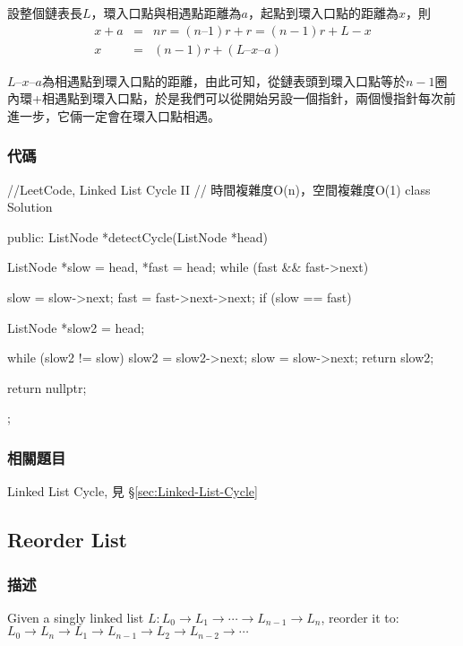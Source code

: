 設整個鏈表長$L$，環入口點與相遇點距離為$a$，起點到環入口點的距離為$x$，則
\begin{eqnarray}
x + a &=& nr = (n – 1)r +r = (n-1)r + L - x \nonumber \\
x &=& (n-1)r + (L – x – a) \nonumber
\end{eqnarray}

$L – x – a$為相遇點到環入口點的距離，由此可知，從鏈表頭到環入口點等於$n-1$圈內環+相遇點到環入口點，於是我們可以從開始另設一個指針，兩個慢指針每次前進一步，它倆一定會在環入口點相遇。


\subsubsection{代碼}
\begin{Code}
//LeetCode, Linked List Cycle II
// 時間複雜度O(n)，空間複雜度O(1)
class Solution {
public:
    ListNode *detectCycle(ListNode *head) {
        ListNode *slow = head, *fast = head;
        while (fast && fast->next) {
            slow = slow->next;
            fast = fast->next->next;
            if (slow == fast) {
                ListNode *slow2 = head;

                while (slow2 != slow) {
                    slow2 = slow2->next;
                    slow = slow->next;
                }
                return slow2;
            }
        }
        return nullptr;
    }
};
\end{Code}


\subsubsection{相關題目}
\begindot
\item Linked List Cycle, 見 \S \ref{sec:Linked-List-Cycle}
\myenddot


\subsection{Reorder List}
\label{sec:reorder-list}


\subsubsection{描述}
Given a singly linked list $L: L_0 \rightarrow L_1 \rightarrow \cdots \rightarrow L_{n-1} \rightarrow L_n$,
reorder it to: $L_0 \rightarrow L_n \rightarrow L_1 \rightarrow L_{n-1} \rightarrow L_2 \rightarrow L_{n-2} \rightarrow \cdots$

